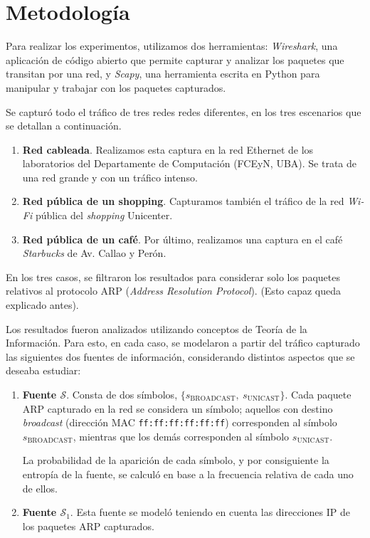 \section{Metodología}

Para realizar los experimentos, utilizamos dos herramientas: \emph{Wireshark},
una aplicación de código abierto que permite capturar y analizar los paquetes
que transitan por una red, y \emph{Scapy}, una herramienta escrita en
Python para manipular y trabajar con los paquetes capturados.

Se capturó todo el tráfico de tres redes redes diferentes, en los tres
escenarios que se detallan a continuación.

\begin{enumerate}
    \item \textbf{Red cableada}. Realizamos esta captura en la red Ethernet
    de los laboratorios del Departamente de Computación (FCEyN, UBA). Se trata
    de una red grande y con un tráfico intenso.
    \item \textbf{Red pública de un shopping}. Capturamos también el tráfico
    de la red \emph{Wi-Fi} pública del \emph{shopping} Unicenter.
    \item \textbf{Red pública de un café}. Por último, realizamos una captura
    en el café \emph{Starbucks} de Av. Callao y Perón.
\end{enumerate}

En los tres casos, se filtraron los resultados para considerar solo los
paquetes relativos al protocolo ARP (\emph{Address Resolution Protocol}).
(Esto capaz queda explicado antes).

Los resultados fueron analizados utilizando conceptos de Teoría de la
Información. Para esto, en cada caso, se modelaron a partir del tráfico
capturado las siguientes dos fuentes de información, considerando distintos
aspectos que se deseaba estudiar:

\begin{enumerate}
    \item \textbf{Fuente $\mathcal{S}$}. Consta de dos símbolos, $\lbrace
    s_{\text{BROADCAST}},\ s_{\text{UNICAST}} \rbrace$. Cada paquete ARP
    capturado en la red se considera un símbolo; aquellos con destino
    \emph{broadcast} (dirección MAC \texttt{ff:ff:ff:ff:ff:ff}) corresponden
    al símbolo $s_{\text{BROADCAST}}$, mientras que los demás corresponden
    al símbolo $s_{\text{UNICAST}}$.

    La probabilidad de la aparición de cada símbolo, y por consiguiente
    la entropía de la fuente, se calculó en base a la frecuencia relativa
    de cada uno de ellos.
    \item \textbf{Fuente $\mathcal{S}_1$}. Esta fuente se modeló teniendo en
    cuenta las direcciones IP de los paquetes ARP capturados.
\end{enumerate}

